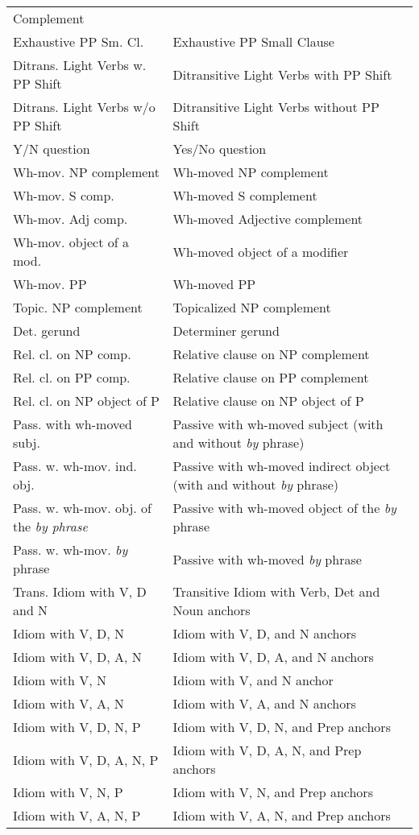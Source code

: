 \begin{tabular}{ll}
Complement\\
Exhaustive PP Sm. Cl.&Exhaustive PP Small Clause\\
Ditrans. Light Verbs w. PP Shift&Ditransitive Light Verbs with PP Shift\\
Ditrans. Light Verbs w/o PP Shift&Ditransitive Light Verbs without PP Shift\\
Y/N question&Yes/No question \\
Wh-mov. NP complement&Wh-moved NP complement \\
Wh-mov. S comp.&Wh-moved S complement \\
Wh-mov. Adj comp.&Wh-moved Adjective complement \\
Wh-mov. object of a mod.&Wh-moved object of a modifier \\
Wh-mov. PP&Wh-moved PP \\
Topic. NP complement&Topicalized NP complement \\
Det. gerund&Determiner gerund \\
Rel. cl. on NP comp.&Relative clause on NP complement \\
Rel. cl. on PP comp.& Relative clause on PP complement\\
Rel. cl. on NP object of P& Relative clause on NP object of P\\
Pass. with wh-moved subj.&Passive with wh-moved subject (with and without {\it by} phrase) \\
Pass. w. wh-mov. ind. obj.&Passive with wh-moved indirect object (with and without {\it by} phrase) \\
Pass. w. wh-mov. obj. of the {\it {\it by} phrase}&Passive with wh-moved object of the {\it by} phrase \\
Pass. w. wh-mov. {\it by} phrase&Passive with wh-moved {\it by} phrase \\
Trans. Idiom with V, D and N & Transitive Idiom with Verb, Det and
Noun anchors\\
Idiom with V, D, N & Idiom with V, D, and N anchors \\
Idiom with V, D, A, N & Idiom with V, D, A, and N anchors \\
Idiom with V, N & Idiom with V, and N anchor \\
Idiom with V, A, N & Idiom with V, A, and N anchors \\
Idiom with V, D, N, P & Idiom with V, D, N, and Prep anchors \\
Idiom with V, D, A, N, P & Idiom with V, D, A, N, and Prep anchors \\
Idiom with V, N, P & Idiom with V, N, and Prep anchors \\
Idiom with V, A, N, P & Idiom with V, A, N, and Prep anchors 
\end{tabular}
\normalsize

